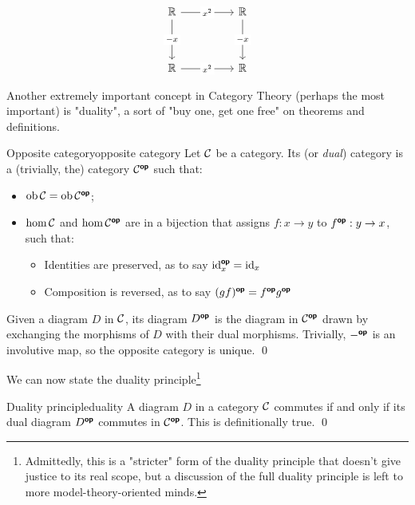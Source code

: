 \documentclass{article}
\begin{document}
\[\begin{tikzcd}
	\R && \R \\
	\\
	\R && \R
	\arrow["{x^2}"{description}, from=1-1, to=1-3]
	\arrow["{-x}"{description}, from=1-1, to=3-1]
	\arrow["{-x}"{description}, from=1-3, to=3-3]
	\arrow["{x^2}"{description}, from=3-1, to=3-3]
\end{tikzcd}\]

Another extremely important concept in Category Theory (perhaps the most important) is "duality", a sort of "buy one, get one free" on theorems and definitions.

\begin{definition}{Opposite category}{opposite category}
    Let $\mathcal{C}$ be a category. Its  (or \emph{dual}) category is a (trivially, the) category $\mathcal{C}^{\text{\sffamily\textbf{op}}}$ such that:\begin{itemize}
        \item $\operatorname{ob}\mathcal{C} = \operatorname{ob}\mathcal{C}^{\text{\sffamily\textbf{op}}}$;
        \item $\hom\mathcal{C}$ and $\hom\mathcal{C}^{\text{\sffamily\textbf{op}}}$ are in a bijection that assigns $f: x\to y$ to $f^{\text{\sffamily\textbf{op}}} : y \to x$, such that:\begin{itemize}
            \item Identities are preserved, as to say $\operatorname{id}_x^{\text{\sffamily\textbf{op}}} = \operatorname{id}_x$
            \item Composition is reversed, as to say $(gf)^{\text{\sffamily\textbf{op}}} = f^{\text{\sffamily\textbf{op}}} g^{\text{\sffamily\textbf{op}}}$
        \end{itemize}
    \end{itemize}
    Given a diagram $D$ in $\mathcal{C}$, its  diagram $D^{\text{\sffamily\textbf{op}}}$ is the diagram in $\mathcal{C}^{\text{\sffamily\textbf{op}}}$ drawn by exchanging the morphisms of $D$ with their dual morphisms.
    \proof 
    Trivially, $-^{\text{\sffamily\textbf{op}}}$ is an involutive map, so the opposite category is unique.
    \qed
\end{definition}

We can now state the duality principle\footnote{Admittedly, this is a "stricter" form of the duality principle that doesn't give justice to its real scope, but a discussion of the full duality principle is left to more model-theory-oriented minds.}

\begin{theorem}{Duality principle}{duality}
    A diagram $D$ in a category $\mathcal{C}$ commutes if and only if its dual diagram $D^{\text{\sffamily\textbf{op}}}$ commutes in $\mathcal{C}^{\text{\sffamily\textbf{op}}}$.
    \proof 
    This is definitionally true.
    \qed
\end{theorem}
\end{document}
